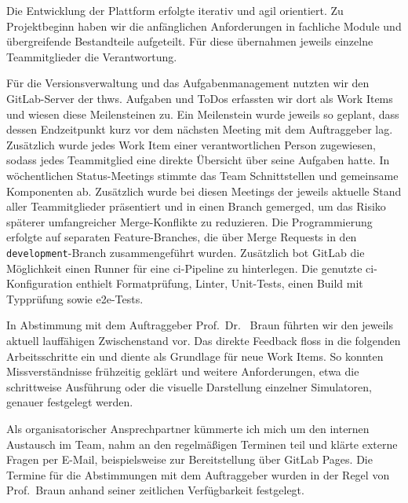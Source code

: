 
Die Entwicklung der Plattform erfolgte iterativ und agil orientiert.  Zu Projektbeginn haben wir die anfänglichen Anforderungen in fachliche Module und übergreifende Bestandteile aufgeteilt. Für diese übernahmen jeweils einzelne Teammitglieder die Verantwortung.

Für die Versionsverwaltung und das Aufgabenmanagement nutzten wir den GitLab-Server der \gls{thws}. Aufgaben und ToDos erfassten wir dort als Work Items und wiesen diese Meilensteinen zu. Ein Meilenstein wurde jeweils so geplant, dass dessen Endzeitpunkt kurz vor dem nächsten Meeting mit dem Auftraggeber lag. Zusätzlich wurde jedes Work Item einer verantwortlichen Person zugewiesen, sodass jedes Teammitglied eine direkte Übersicht über seine Aufgaben hatte.
In wöchentlichen Status-Meetings stimmte das Team Schnittstellen und gemeinsame Komponenten ab. Zusätzlich wurde bei diesen Meetings der jeweils aktuelle Stand aller Teammitglieder präsentiert und in einen Branch gemerged, um das Risiko späterer umfangreicher Merge-Konflikte zu reduzieren.
Die Programmierung erfolgte auf separaten Feature-Branches, die über Merge Requests in den \texttt{development}-Branch zusammengeführt wurden. Zusätzlich bot GitLab die Möglichkeit einen Runner für eine \gls{ci}-Pipeline zu hinterlegen. Die genutzte \gls{ci}-Konfiguration enthielt Formatprüfung, Linter, Unit-Tests, einen Build mit Typprüfung sowie \gls{e2e}-Tests.

In Abstimmung mit dem Auftraggeber Prof.~Dr.~ Braun führten wir den jeweils aktuell lauffähigen Zwischenstand vor. Das direkte Feedback floss in die folgenden Arbeitsschritte ein und diente als Grundlage für neue Work Items. So konnten Missverständnisse frühzeitig geklärt und weitere Anforderungen, etwa die schrittweise Ausführung oder die visuelle Darstellung einzelner Simulatoren, genauer festgelegt werden.

Als organisatorischer Ansprechpartner kümmerte ich mich um den internen Austausch im Team, nahm an den regelmäßigen Terminen teil und klärte externe Fragen per E-Mail, beispielsweise zur Bereitstellung über GitLab Pages. Die Termine für die Abstimmungen mit dem Auftraggeber wurden in der Regel von Prof.~Braun anhand seiner zeitlichen Verfügbarkeit festgelegt.

